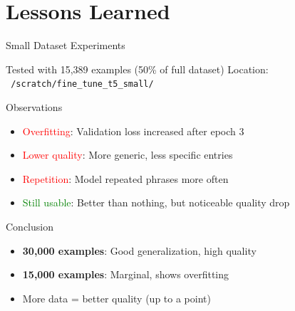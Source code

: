 \section{Lessons Learned}
\begin{frame}{Small Dataset Experiments}
\begin{block}{Tested with 15,389 examples (50\% of full dataset)}
Location: \texttt{~/scratch/fine\_tune\_t5\_small/}
\end{block}

\begin{block}{Observations}
\begin{itemize}
  \item \textcolor{red}{Overfitting}: Validation loss increased after epoch 3
  \item \textcolor{red}{Lower quality}: More generic, less specific entries
  \item \textcolor{red}{Repetition}: Model repeated phrases more often
  \item \textcolor{green}{Still usable}: Better than nothing, but noticeable quality drop
\end{itemize}
\end{block}

\begin{block}{Conclusion}
\begin{itemize}
  \item \textbf{30,000 examples}: Good generalization, high quality
  \item \textbf{15,000 examples}: Marginal, shows overfitting
  \item More data = better quality (up to a point)
\end{itemize}
\end{block}
\end{frame}


